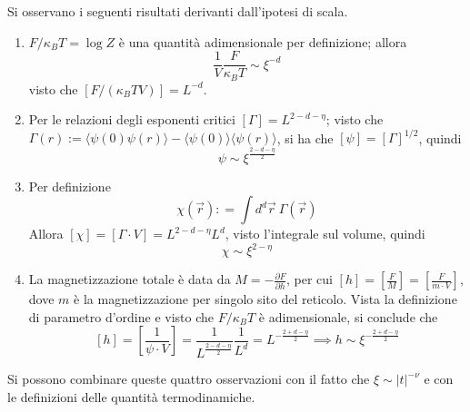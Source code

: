 \documentclass[11pt, a4paper]{scrartcl}
\theoremstyle{style}
\theoremstyle{style1}
\numberwithin{equation}{subsection}
\begin{document}
\noindent Si osservano i seguenti risultati derivanti dall'ipotesi di scala.
\begin{enumerate}[(1).]
	\item $F / \kappa _B T = \log Z$ \`e una quantit\`a adimensionale per definizione; allora
		\[
		\frac{1}{V}\frac{F}{\kappa _B T} \sim \xi ^{-d}
		\] 
		visto che $[F / (\kappa _B T V)]= L^{-d}$.
	\item Per le relazioni degli esponenti critici $[\Gamma] = L^{2- d - \eta} $; visto che $\Gamma(r) := \langle \psi (0) \psi (r) \rangle- \langle \psi (0) \rangle\langle \psi (r) \rangle$, si ha che $[\psi ] = [\Gamma]^{1 / 2}$, quindi 
		\[
		\psi \sim \xi  ^{\frac{2- d - \eta }{2}}
		\] 
	\item Per definizione
		\[
		\chi (\vec{r}) : = \int d^d \vec{r} \ \Gamma(\vec{r})
		\] 
		Allora $[\chi ] = [\Gamma \cdot V] = L^{2 - d -\eta}L^{d}$, visto l'integrale sul volume, quindi
		\[
			\chi \sim\xi ^{2-\eta}
		\] 
	\item La magnetizzazione totale \`e data da $M = - \frac{\partial F}{\partial h} $, per cui $[h] = \left[ \frac{F}{M} \right] = \left[ \frac{F}{m\cdot V} \right]  $, dove $m$ \`e la magnetizzazione per singolo sito del reticolo.
		Vista la definizione di parametro d'ordine e visto che $F / \kappa _B T $ \`e adimensionale, si conclude che
		\[
			[h] = \left[ \frac{1}{\psi \cdot V} \right] = \frac{1}{L^{\frac{2 - d - \eta}{2}}} \frac{1}{L^d} = L ^{- \frac{2+ d - \eta}{2}} \implies h \sim\xi ^{- \frac{2+d -\eta}{2}}
		\] 
\end{enumerate}
Si possono combinare queste quattro osservazioni con il fatto che $\xi \sim \lvert t \rvert ^{-\nu }$ e con le definizioni delle quantit\`a termodinamiche.
\end{document}
